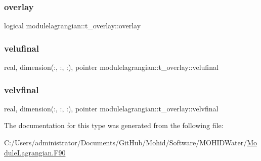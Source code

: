 \subsubsection{\texorpdfstring{overlay}{overlay}}
{\footnotesize\ttfamily logical modulelagrangian\+::t\+\_\+overlay\+::overlay\hspace{0.3cm}{\ttfamily [private]}}

\mbox{\label{structmodulelagrangian_1_1t__overlay_a9001e11332910b40392150e49a9c6c65}} 
\subsubsection{\texorpdfstring{velufinal}{velufinal}}
{\footnotesize\ttfamily real, dimension(\+:, \+:, \+:), pointer modulelagrangian\+::t\+\_\+overlay\+::velufinal\hspace{0.3cm}{\ttfamily [private]}}

\mbox{\label{structmodulelagrangian_1_1t__overlay_a7c811a715c51c5700309be6a4576e121}} 
\subsubsection{\texorpdfstring{velvfinal}{velvfinal}}
{\footnotesize\ttfamily real, dimension(\+:, \+:, \+:), pointer modulelagrangian\+::t\+\_\+overlay\+::velvfinal\hspace{0.3cm}{\ttfamily [private]}}



The documentation for this type was generated from the following file\+:\begin{DoxyCompactItemize}
\item 
C\+:/\+Users/administrator/\+Documents/\+Git\+Hub/\+Mohid/\+Software/\+M\+O\+H\+I\+D\+Water/\mbox{\hyperlink{_module_lagrangian_8_f90}{Module\+Lagrangian.\+F90}}\end{DoxyCompactItemize}

